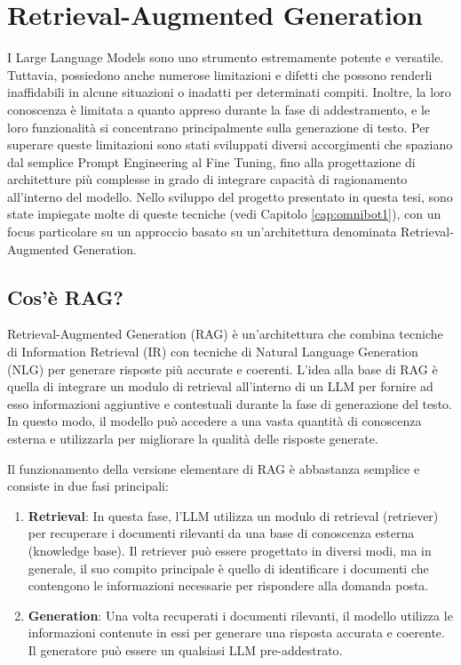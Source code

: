 \chapter{Retrieval-Augmented Generation}
I Large Language Models sono uno strumento estremamente potente e versatile. Tuttavia, possiedono anche numerose limitazioni e difetti che possono renderli inaffidabili in alcune situazioni o inadatti per determinati compiti. Inoltre, la loro conoscenza è limitata a quanto appreso durante la fase di addestramento, e le loro funzionalità si concentrano principalmente sulla generazione di testo. Per superare queste limitazioni sono stati sviluppati diversi accorgimenti che spaziano dal semplice Prompt Engineering al Fine Tuning, fino alla progettazione di architetture più complesse in grado di integrare capacità di ragionamento all'interno del modello.
Nello sviluppo del progetto presentato in questa tesi, sono state impiegate molte di queste tecniche (vedi Capitolo \ref{cap:omnibot1}), con un focus particolare su un approccio basato su un'architettura denominata Retrieval-Augmented Generation.

\section{Cos'è RAG?}
Retrieval-Augmented Generation (RAG) \cite{whatisrag,raghandbook,gao2024retrievalaugmentedgenerationlargelanguage} è un'architettura che combina tecniche di Information Retrieval (IR) con tecniche di Natural Language Generation (NLG) per generare risposte più accurate e coerenti. L'idea alla base di RAG è quella di integrare un modulo di retrieval all'interno di un LLM per fornire ad esso informazioni aggiuntive e contestuali durante la fase di generazione del testo. In questo modo, il modello può accedere a una vasta quantità di conoscenza esterna e utilizzarla per migliorare la qualità delle risposte generate.

Il funzionamento della versione elementare di RAG è abbastanza semplice e consiste in due fasi principali:
\begin{enumerate}
    \item \textbf{Retrieval}: In questa fase, l'LLM utilizza un modulo di retrieval (retriever) per recuperare i documenti rilevanti da una base di conoscenza esterna (knowledge base). Il retriever può essere progettato in diversi modi, ma in generale, il suo compito principale è quello di identificare i documenti che contengono le informazioni necessarie per rispondere alla domanda posta.
    \item \textbf{Generation}: Una volta recuperati i documenti rilevanti, il modello utilizza le informazioni contenute in essi per generare una risposta accurata e coerente. Il generatore può essere un qualsiasi LLM pre-addestrato.
\end{enumerate}

